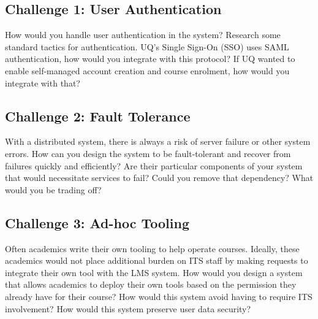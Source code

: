 \documentclass{csse4400}
\begin{document}

\subsection*{Challenge 1: User Authentication}
How would you handle user authentication in the system?
Research some standard tactics for authentication.
UQ's Single Sign-On (SSO) uses SAML authentication,
how would you integrate with this protocol?
If UQ wanted to enable self-managed account creation and course enrolment,
how would you integrate with that?

\subsection*{Challenge 2: Fault Tolerance}
With a distributed system,
there is always a risk of server failure or other system errors.
How can you design the system to be fault-tolerant and recover from failures quickly and efficiently?
Are their particular components of your system that would necessitate services to fail?
Could you remove that dependency?
What would you be trading off?

\subsection*{Challenge 3: Ad-hoc Tooling}
Often academics write their own tooling to help operate courses.
Ideally, these academics would not place additional burden on ITS staff by making requests to integrate their own tool with the LMS system.
How would you design a system that allows academics to deploy their own tools based on the permission they already have for their course?
How would this system avoid having to require ITS involvement?
How would this system preserve user data security?
\end{document}
